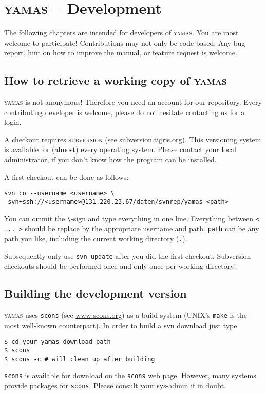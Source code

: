 \chapter[Development]{\textsc{yamas} -- Development}

The following chapters are intended for developers of \textsc{yamas}. You are most welcome to participate! Contributions may not only be code-based: Any bug report, hint on how to improve the manual, or feature request is welcome.

\section{How to retrieve a working copy of \textsc{yamas}}

\textsc{yamas} is not anonymous! Therefore you need an account for our repository. Every contributing developer is welcome, please do not hesitate contacting us for a login.

A checkout requires \textsc{subversion} (see \url{subversion.tigris.org}). This versioning system is available for (almost) every operating system. Please contact your local administrator, if you don't know how the program can be installed.

A first checkout can be done as follows:

\begin{lstlisting}[style=shell]
svn co --username <username> \
 svn+ssh://<username>@131.220.23.67/daten/svnrep/yamas <path>
\end{lstlisting}

You can ommit the \verb+\+-sign and type everything in one line. Everything between \verb+< ... >+ should be replace by the appropriate username and path. \verb+path+ can be any path you like, including the current working directory (\verb+.+).

\alert{Subsequently only use \texttt{svn update} after you did the first checkout. Subversion checkouts should be performed once and only once per working directory!}

\section{Building the development version}
\textsc{yamas} uses \texttt{scons} (see \url{www.scons.org}) as a build system (UNIX's \texttt{make} is the most well-known counterpart). In order to build a svn download just type
\begin{lstlisting}[style=shell]
$ cd your-yamas-download-path
$ scons
$ scons -c # will clean up after building
\end{lstlisting}
\texttt{scons} is available for download on the \texttt{scons} web page. However, many systems provide packages for \texttt{scons}. Please consult your sys-admin if in doubt.

